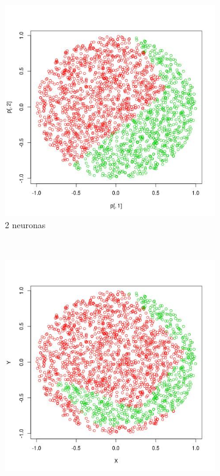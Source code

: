 \documentclass[12pt, a4paper]{article}
\begin{document}
\begin{figure}
    \centering

    \begin{subfigure}[b]{0.4\textwidth}
        \includegraphics[width=\textwidth]{prediccion1}
        \caption{2 neuronas}
    \end{subfigure}
      ~ %
    \begin{subfigure}[b]{0.4\textwidth}
        \includegraphics[width=\textwidth]{prediccion2}

\end{subfigure}
\end{figure}
\end{document}
